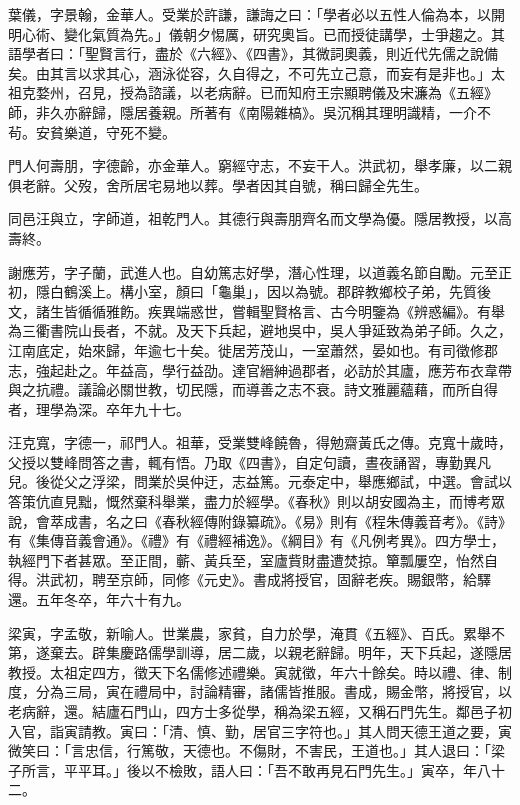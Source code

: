 \begin{pinyinscope}
葉儀，字景翰，金華人。受業於許謙，謙誨之曰：「學者必以五性人倫為本，以開明心術、變化氣質為先。」儀朝夕惕厲，研究奧旨。已而授徒講學，士爭趨之。其語學者曰：「聖賢言行，盡於《六經》、《四書》，其微詞奧義，則近代先儒之說備矣。由其言以求其心，涵泳從容，久自得之，不可先立己意，而妄有是非也。」太祖克婺州，召見，授為諮議，以老病辭。已而知府王宗顯聘儀及宋濂為《五經》師，非久亦辭歸，隱居養親。所著有《南陽雜槁》。吳沉稱其理明識精，一介不茍。安貧樂道，守死不變。

門人何壽朋，字德齡，亦金華人。窮經守志，不妄干人。洪武初，舉孝廉，以二親俱老辭。父歿，舍所居宅易地以葬。學者因其自號，稱曰歸全先生。

同邑汪與立，字師道，祖乾門人。其德行與壽朋齊名而文學為優。隱居教授，以高壽終。

謝應芳，字子蘭，武進人也。自幼篤志好學，潛心性理，以道義名節自勵。元至正初，隱白鶴溪上。構小室，顏曰「龜巢」，因以為號。郡辟教鄉校子弟，先質後文，諸生皆循循雅飭。疾異端惑世，嘗輯聖賢格言、古今明鑒為《辨惑編》。有舉為三衢書院山長者，不就。及天下兵起，避地吳中，吳人爭延致為弟子師。久之，江南底定，始來歸，年逾七十矣。徙居芳茂山，一室蕭然，晏如也。有司徵修郡志，強起赴之。年益高，學行益劭。達官縉紳過郡者，必訪於其廬，應芳布衣韋帶與之抗禮。議論必關世教，切民隱，而導善之志不衰。詩文雅麗蘊藉，而所自得者，理學為深。卒年九十七。

汪克寬，字德一，祁門人。祖華，受業雙峰饒魯，得勉齋黃氏之傳。克寬十歲時，父授以雙峰問答之書，輒有悟。乃取《四書》，自定句讀，晝夜誦習，專勤異凡兒。後從父之浮梁，問業於吳仲迂，志益篤。元泰定中，舉應鄉試，中選。會試以答策伉直見黜，慨然棄科舉業，盡力於經學。《春秋》則以胡安國為主，而博考眾說，會萃成書，名之曰《春秋經傳附錄纂疏》。《易》則有《程朱傳義音考》。《詩》有《集傳音義會通》。《禮》有《禮經補逸》。《綱目》有《凡例考異》。四方學士，執經門下者甚眾。至正間，蘄、黃兵至，室廬貲財盡遭焚掠。簞瓢屢空，怡然自得。洪武初，聘至京師，同修《元史》。書成將授官，固辭老疾。賜銀幣，給驛還。五年冬卒，年六十有九。

梁寅，字孟敬，新喻人。世業農，家貧，自力於學，淹貫《五經》、百氏。累舉不第，遂棄去。辟集慶路儒學訓導，居二歲，以親老辭歸。明年，天下兵起，遂隱居教授。太祖定四方，徵天下名儒修述禮樂。寅就徵，年六十餘矣。時以禮、律、制度，分為三局，寅在禮局中，討論精審，諸儒皆推服。書成，賜金幣，將授官，以老病辭，還。結廬石門山，四方士多從學，稱為梁五經，又稱石門先生。鄰邑子初入官，詣寅請教。寅曰：「清、慎、勤，居官三字符也。」其人問天德王道之要，寅微笑曰：「言忠信，行篤敬，天德也。不傷財，不害民，王道也。」其人退曰：「梁子所言，平平耳。」後以不檢敗，語人曰：「吾不敢再見石門先生。」寅卒，年八十二。


\end{pinyinscope}
